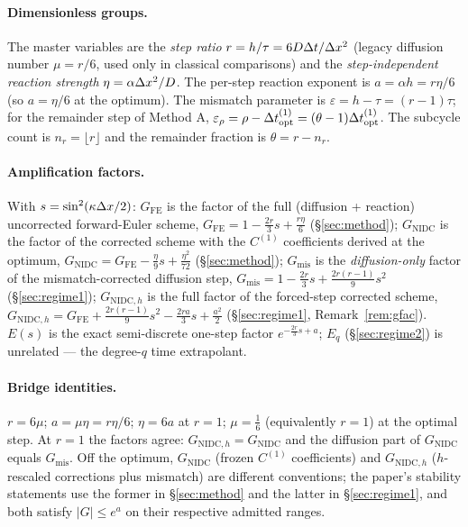 \paragraph{Dimensionless groups.} The master variables are the \emph{step
ratio} $r=h/\tau=6D\Delta t/\Delta x^2$ (legacy diffusion number $\mu=r/6$, used only in
classical comparisons) and the \emph{step-independent reaction strength}
$\eta=\alpha\Delta x^2/D$. The per-step reaction exponent is $a=\alpha h=r\eta/6$
(so $a=\eta/6$ at the optimum). The mismatch parameter is
$\varepsilon=h-\tau=(r-1)\tau$; for the remainder step of Method A,
$\varepsilon_\rho=\rho-\Delta t_{\mathrm{opt}}^{(1)}=(\theta-1)\Delta t_{\mathrm{opt}}^{(1)}$. The subcycle count is
$n_r=\lfloor r\rfloor$ and the remainder fraction is $\theta=r-n_r$.

\paragraph{Amplification factors.} With $s=\sin^2(\kappa\Delta x/2)$:
$G_{\mathrm{FE}}$ is the factor of the full (diffusion + reaction) uncorrected
forward-Euler scheme, $G_{\mathrm{FE}}=1-\frac{2r}{3}s+\frac{r\eta}{6}$
(\S\ref{sec:method}); $G_{\mathrm{NIDC}}$ is the factor of the corrected scheme
with the $C^{(1)}$ coefficients derived at the optimum,
$G_{\mathrm{NIDC}}=G_{\mathrm{FE}}-\frac{\eta}{9}s+\frac{\eta^2}{72}$
(\S\ref{sec:method}); $G_{\mathrm{mis}}$ is the \emph{diffusion-only} factor of
the mismatch-corrected diffusion step,
$G_{\mathrm{mis}}=1-\frac{2r}{3}s+\frac{2r(r-1)}{9}s^2$ (\S\ref{sec:regime1});
$G_{\mathrm{NIDC},h}$ is the full factor of the forced-step corrected scheme,
$G_{\mathrm{NIDC},h}=G_{\mathrm{FE}}+\frac{2r(r-1)}{9}s^2-\frac{2ra}{3}s+\frac{a^2}{2}$
(\S\ref{sec:regime1}, Remark~\ref{rem:gfac}). $E(s)$ is the exact semi-discrete
one-step factor $e^{-\frac{2r}{3}s+a}$; $E_q$ (\S\ref{sec:regime2}) is
unrelated --- the degree-$q$ time extrapolant.

\paragraph{Bridge identities.} $r=6\mu$; $a=\mu\eta=r\eta/6$; $\eta=6a$ at
$r=1$; $\mu=\frac16$ (equivalently $r=1$) at the optimal step. At $r=1$ the
factors agree: $G_{\mathrm{NIDC},h}=G_{\mathrm{NIDC}}$ and the diffusion part
of $G_{\mathrm{NIDC}}$ equals $G_{\mathrm{mis}}$. Off the optimum,
$G_{\mathrm{NIDC}}$ (frozen $C^{(1)}$ coefficients) and $G_{\mathrm{NIDC},h}$
($h$-rescaled corrections plus mismatch) are different conventions; the paper's
stability statements use the former in \S\ref{sec:method} and the latter in
\S\ref{sec:regime1}, and both satisfy $|G|\le e^{a}$ on their respective
admitted ranges.

